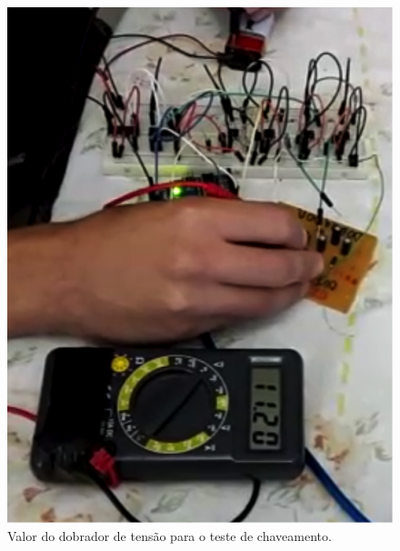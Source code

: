 \begin{anexosenv}
      \begin{figure}
          \begin{center}
              \includegraphics{figuras/teste_alimentacao_1.png}
          \end{center}
          \caption{Valor do dobrador de tensão para o  teste de chaveamento.}
          \label{fig:teste_alimentacao_1.png}
      \end{figure}


\end{anexosenv}
